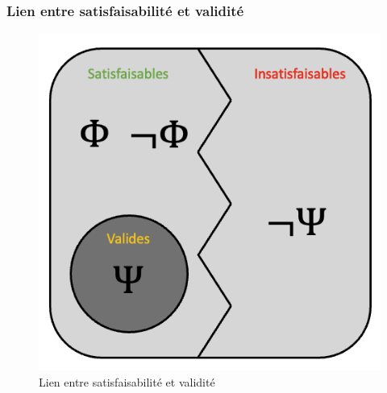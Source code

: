 \documentclass[a4paper, 12pt]{extarticle}
\begin{document}
\subsubsection{Lien entre satisfaisabilité et validité}
\begin{figure}[H]
  \centering
  \includegraphics[scale=0.5]{pictures/satisf:vali.png}
  \caption{Lien entre satisfaisabilité et validité}
\end{figure}
\end{document}
